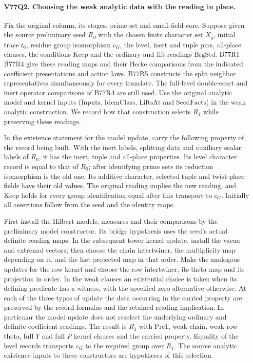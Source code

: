 \paragraph{V77Q2. Choosing the weak analytic data with the reading in place.}
Fix the original column, its stages, prime set and small-field
core. Suppose given the source preliminary seed $R_0$ with the
chosen finite character set $X_g$, initial trace $t_0$, residue
group isomorphism $c_G$, the level, inert and tuple pins,
all-place clauses, the conditions $\mathrm{Keep}$ and the
ordinary and lift readings $\mathrm{BrgStd}$. B77R1--B77R4 give
these reading maps and their Hecke comparisons from the indicated
coefficient presentations and action laws. B77R5 constructs the
split neighbor representatives simultaneously for every translate.
The full-level double-coset and inert operator comparisons of B77R4
are still used. Use the original
analytic model and kernel inputs ($\mathrm{Inputs}$,
$\mathrm{IdemClass}$, $\mathrm{LiftsAt}$ and $\mathrm{SeedFacts}$)
in the weak analytic construction. We record how that construction
selects $R_1$ while preserving these readings.

In the existence statement for the model update, carry the following
property of the record being built. With the inert labels, splitting
data and auxiliary scalar labels of $R_0$, it has the inert, tuple
and all-place properties. Its level character record is equal to
that of $R_0$; after identifying prime sets its reduction
isomorphism is the old one. Its additive character, selected
tuple and twist-place fields have their old values. The original
reading implies the new reading, and $\mathrm{Keep}$ holds for
every group identification equal after this transport to $c_G$.
Initially all assertions follow from the seed and the identity maps.

First install the Hilbert models, measures and their comparisons by
the preliminary model constructor. Its bridge hypothesis uses the
seed's actual definite reading maps. In the subsequent tower
kernel update, install the vacua and extremal vectors; then choose
the chain intertwiner, the multiplicity map depending on it, and
the last projected map in that order. Make the analogous updates
for the row kernel and choose the row intertwiner, its theta map
and its projection in order. In the weak clauses an existential
choice is taken when its defining predicate has a witness, with
the specified zero alternative otherwise. At each of the three
types of update the data occurring in the carried property are
preserved by the record formulas and the retained reading
implication. In particular the model update does not reselect the
underlying ordinary and definite coefficient readings. The result
is $R_1$ with $\mathrm{Pre1}$, weak chain, weak row theta, full
$Y$ and full $P$ kernel clauses and the carried property. Equality
of the level records transports $c_G$ to the required group over
$R_1$. The source analytic existence inputs to these constructors
are hypotheses of this selection.

